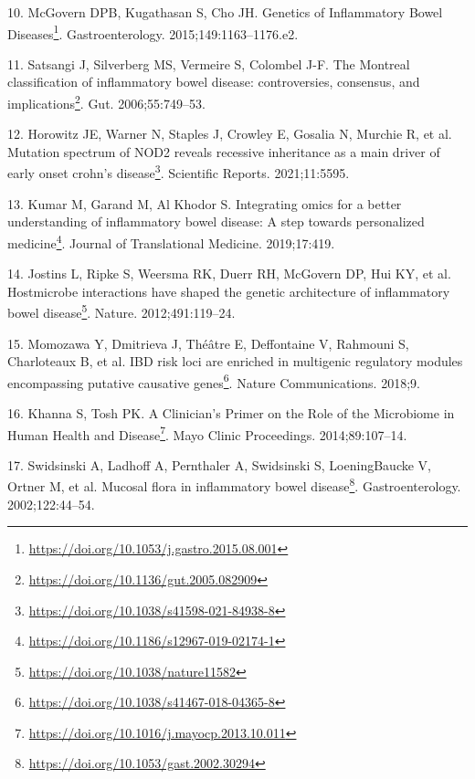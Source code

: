 \documentclass[
  a4paper,
]{book}
\DeclareRobustCommand{\href}[2]{#2\footnote{\url{#1}}}
\newlength{\cslhangindent}
\newlength{\cslentryspacingunit} %
\newenvironment{CSLReferences}[2] %
 {%
  \setlength{\parindent}{0pt}
  \ifodd #1
  \let\oldpar\par
  \def\par{\hangindent=\cslhangindent\oldpar}
  \fi
  \setlength{\parskip}{#2\cslentryspacingunit}
 }%
 {}
\begin{document}
\begin{CSLReferences}{0}{0}
\leavevmode{}%
10. McGovern DPB, Kugathasan S, Cho JH. \href{https://doi.org/10.1053/j.gastro.2015.08.001}{Genetics of Inflammatory Bowel Diseases}. Gastroenterology. 2015;149:1163--1176.e2.

\leavevmode{}%
11. Satsangi J, Silverberg MS, Vermeire S, Colombel J-F. \href{https://doi.org/10.1136/gut.2005.082909}{The Montreal classification of inflammatory bowel disease: controversies, consensus, and implications}. Gut. 2006;55:749--53.

\leavevmode{}%
12. Horowitz JE, Warner N, Staples J, Crowley E, Gosalia N, Murchie R, et al. \href{https://doi.org/10.1038/s41598-021-84938-8}{Mutation spectrum of NOD2 reveals recessive inheritance as a main driver of early onset crohn{'}s disease}. Scientific Reports. 2021;11:5595.

\leavevmode{}%
13. Kumar M, Garand M, Al Khodor S. \href{https://doi.org/10.1186/s12967-019-02174-1}{Integrating omics for a better understanding of inflammatory bowel disease: A step towards personalized medicine}. Journal of Translational Medicine. 2019;17:419.

\leavevmode{}%
14. Jostins L, Ripke S, Weersma RK, Duerr RH, McGovern DP, Hui KY, et al. \href{https://doi.org/10.1038/nature11582}{Host{\textendash}microbe interactions have shaped the genetic architecture of inflammatory bowel disease}. Nature. 2012;491:119--24.

\leavevmode{}%
15. Momozawa Y, Dmitrieva J, Théâtre E, Deffontaine V, Rahmouni S, Charloteaux B, et al. \href{https://doi.org/10.1038/s41467-018-04365-8}{IBD risk loci are enriched in multigenic regulatory modules encompassing putative causative genes}. Nature Communications. 2018;9.

\leavevmode{}%
16. Khanna S, Tosh PK. \href{https://doi.org/10.1016/j.mayocp.2013.10.011}{A Clinician's Primer on the Role of the Microbiome in Human Health and Disease}. Mayo Clinic Proceedings. 2014;89:107--14.

\leavevmode{}%
17. Swidsinski A, Ladhoff A, Pernthaler A, Swidsinski S, LoeningBaucke V, Ortner M, et al. \href{https://doi.org/10.1053/gast.2002.30294}{Mucosal flora in inflammatory bowel disease}. Gastroenterology. 2002;122:44--54.


\end{CSLReferences}
\end{document}
